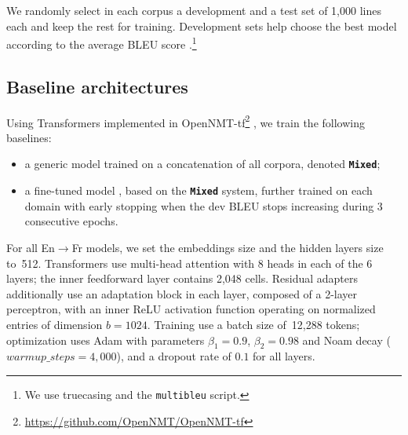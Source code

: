 \documentclass[11pt,a4paper]{article}
\newcommand{\fyDone}[1]{\done[FY]\Todo[FY:]{\textcolor{orange}{#1}}}
\newcommand{\fyFuture}[1]{\done[FY]\Todo[FY:]{\textcolor{red}{#1}}}
\newcommand{\system}[1]{\texttt{\textbf{#1}}}
\begin{document}
We randomly select in each corpus a development and a test set of 1,000 lines each and keep the rest for training. Development sets help choose the best model according to the average BLEU score \cite{Papineni02bleu}.\footnote{We use truecasing and the \texttt{multibleu} script.}\fyDone{A word about meta-parameter settings}
\fyFuture{Is this part on significance testing still accurate ?}

\subsection{Baseline architectures \label{ssec:baseline}}
\fyDone{Write this - settings and parameters for Mixed and Full-FT}
Using Transformers \cite{Vaswani17attention} implemented in OpenNMT-tf\footnote{\url{https://github.com/OpenNMT/OpenNMT-tf}} \cite{Klein17opennmt}, we train the following baselines:
\begin{itemize}
\item a generic model trained on a concatenation of all corpora, denoted \system{Mixed};\fyDone{Or mixed nat ?}
\item a fine-tuned model \cite{Luong15stanford,Freitag16fast}, based on the \system{Mixed} system, further trained on each domain with early stopping when the dev BLEU stops increasing during 3 consecutive epochs.
\end{itemize}

For all En$\rightarrow$Fr models, we set the embeddings size and the hidden layers size to~512. Transformers use multi-head attention with 8 heads in each of the 6 layers; the inner feedforward layer contains 2,048 cells. Residual adapters additionally use an adaptation block in each layer, composed of a 2-layer perceptron, with an inner ReLU activation function operating on normalized entries of dimension $b=1024$.
Training use a batch size of~12,288 tokens; optimization uses Adam with parameters $\beta_1=0.9$, $\beta_2= 0.98$ and Noam decay ($warmup\_steps=4,000$), and a dropout rate of $0.1$ for all layers.\fyDone{Describe the block adaptation layer - voir slides}
\end{document}
